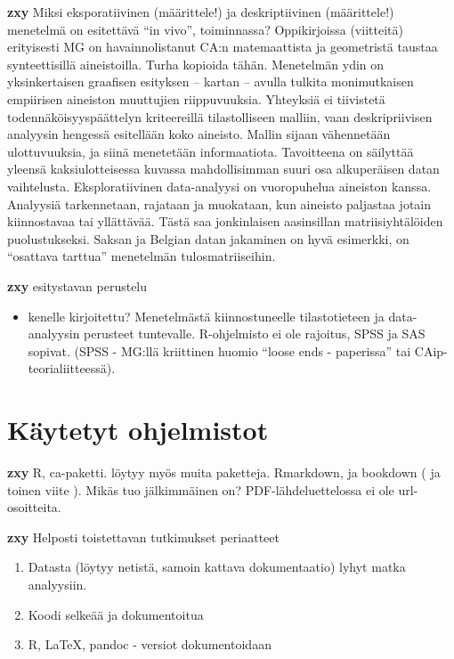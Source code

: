 \documentclass[finnish,]{book}
\providecommand{\tightlist}{%
  \setlength{\itemsep}{0pt}\setlength{\parskip}{0pt}}
\begin{document}
\textbf{zxy} Miksi eksporatiivinen (määrittele!) ja deskriptiivinen
(määrittele!) menetelmä on esitettävä ``in vivo'', toiminnassa?
Oppikirjoissa (viitteitä) erityisesti MG on havainnolistanut CA:n
matemaattista ja geometristä taustaa synteettisillä aineistoilla. Turha
kopioida tähän. Menetelmän ydin on yksinkertaisen graafisen esityksen --
kartan -- avulla tulkita monimutkaisen empiirisen aineiston muuttujien
riippuvuuksia. Yhteyksiä ei tiivistetä todennäköisyyspäättelyn
kriteereillä tilastolliseen malliin, vaan deskripriivisen analyysin
hengessä esitellään koko aineisto. Mallin sijaan vähennetään
ulottuvuuksia, ja siinä menetetään informaatiota. Tavoitteena on
säilyttää yleensä kaksiulotteisessa kuvassa mahdollisimman suuri osa
alkuperäisen datan vaihtelusta. Eksploratiivinen data-analyysi on
vuoropuhelua aineiston kanssa. Analyysiä tarkennetaan, rajataan ja
muokataan, kun aineisto paljastaa jotain kiinnostavaa tai yllättävää.
Tästä saa jonkinlaisen aasinsillan matriisiyhtälöiden puolustukseksi.
Saksan ja Belgian datan jakaminen on hyvä esimerkki, on ``osattava
tarttua'' menetelmän tulosmatriiseihin.

\textbf{zxy} esitystavan perustelu

\begin{itemize}
\tightlist
\item
  kenelle kirjoitettu? Menetelmästä kiinnostuneelle tilastotieteen ja
  data-analyysin perusteet tuntevalle. R-ohjelmisto ei ole rajoitus,
  SPSS ja SAS sopivat. (SPSS - MG:llä kriittinen huomio ``loose ends -
  paperissa'' tai CAip-teorialiitteessä).
\end{itemize}

\hypertarget{kaytetyt-ohjelmistot}{%
\section{Käytetyt ohjelmistot}\label{kaytetyt-ohjelmistot}}

\textbf{zxy} R, ca-paketti. löytyy myös muita paketteja.
Rmarkdown\citep{RefWorks:doc:5b6b346fe4b0c619b11b8a3e}, ja bookdown
(\citep{RefWorks:doc:5b6b36dde4b09b7ec442bf8b} ja toinen viite
\citep{R-bookdown}). Mikäs tuo jälkimmäinen on? PDF-lähdeluettelossa ei
ole url-osoitteita.

\textbf{zxy} Helposti toistettavan tutkimukset periaatteet

\begin{enumerate}
\def\labelenumi{\arabic{enumi}.}
\tightlist
\item
  Datasta (löytyy netistä, samoin kattava dokumentaatio) lyhyt matka
  analyysiin.
\item
  Koodi selkeää ja dokumentoitua
\item
  R, LaTeX, pandoc - versiot dokumentoidaan
\end{enumerate}
\end{document}
